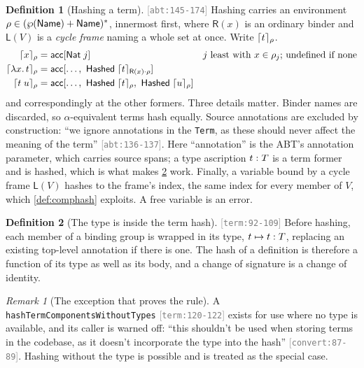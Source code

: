 \documentclass[11pt]{article}
\theoremstyle{definition}
\newtheorem{definition}{Definition}[section]
\theoremstyle{plain}
\theoremstyle{remark}
\newtheorem{remark}{Remark}[section]
\newcommand{\src}[1]{{\footnotesize\textcolor{gray}{[\texttt{#1}]}}}
\begin{document}
\begin{definition}[Hashing a term]\label{def:uhash}
\src{abt:145-174} Hashing carries an environment
$\rho \in (\wp(\mathsf{Name}) + \mathsf{Name})^{*}$, innermost first, where $\mathsf{R}(x)$ is an ordinary binder and
$\mathsf{L}(V)$ is a \emph{cycle frame} naming a whole set at once. Write $\lceil t \rceil_{\rho}$.
\begin{align*}
  \uhash{\HEnv}{\uvar{x}}    &= \mathsf{acc}[\mathsf{Nat}\; j]
     && \text{$j$ least with $x \in \HEnv_j$; undefined if none}\\
  \uhash{\HEnv}{\ulam{x}{t}} &= \mathsf{acc}[\ldots,\ \mathsf{Hashed}\;\uhash{\mathsf{R}(x)\cdot\HEnv}{t}]\\
  \uhash{\HEnv}{\uapp{t}{u}} &= \mathsf{acc}[\ldots,\ \mathsf{Hashed}\;\uhash{\HEnv}{t},\ \mathsf{Hashed}\;\uhash{\HEnv}{u}]
\end{align*}
and correspondingly at the other formers. Three details matter. Binder names are discarded, so
$\alpha$-equivalent terms hash equally. Source annotations are excluded by construction: ``we ignore
annotations in the \texttt{Term}, as these should never affect the meaning of the term''
\src{abt:136-137}. Here ``annotation'' is the ABT's annotation parameter, which carries source spans;
a type ascription $t : T$ is a term former and is hashed, which is what makes
\cref{def:typeinhash} work. Finally, a variable bound by a cycle frame $\mathsf{L}(V)$ hashes to the
frame's index, the same index for every member of $V$, which \cref{def:comphash} exploits. A free
variable is an error.
\end{definition}

\begin{definition}[The type is inside the term hash]\label{def:typeinhash}
\src{term:92-109} Before hashing, each member of a binding group is wrapped in its type,
$t \mapsto t : T$, replacing an existing top-level annotation if there is one. The hash of a
definition is therefore a function of its type as well as its body, and a change of signature is a
change of identity.
\end{definition}

\begin{remark}[The exception that proves the rule]\label{rem:typeinhash}
A \texttt{hashTermComponentsWithoutTypes} \src{term:120-122} exists for use where no type is
available, and its caller is warned off: ``this shouldn't be used when storing terms in the codebase,
as it doesn't incorporate the type into the hash'' \src{convert:87-89}. Hashing without the type is
possible and is treated as the special case.
\end{remark}
\end{document}
